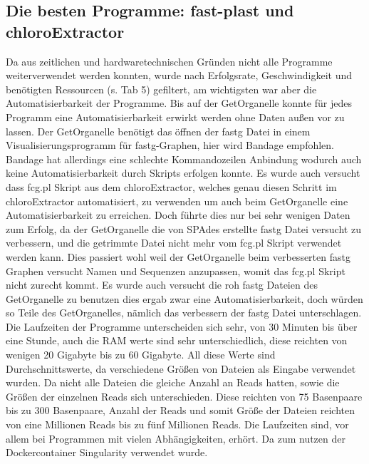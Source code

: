 \documentclass{scrartcl}
\begin{document}
\subsection{Die besten Programme: fast-plast und chloroExtractor}
\label{sec-4-5}
Da aus zeitlichen und hardwaretechnischen Gründen nicht alle Programme weiterverwendet werden konnten, wurde nach Erfolgsrate, Geschwindigkeit und benötigten Ressourcen (s. Tab 5)
gefiltert, am wichtigsten war aber die Automatisierbarkeit der Programme. Bis auf der GetOrganelle konnte für jedes Programm eine Automatisierbarkeit
erwirkt werden ohne Daten außen vor zu lassen. Der GetOrganelle benötigt das öffnen der fastg Datei in einem Visualisierungsprogramm für fastg-Graphen, hier wird Bandage empfohlen.
Bandage hat allerdings eine schlechte Kommandozeilen Anbindung wodurch auch keine Automatisierbarkeit durch Skripts erfolgen konnte.
Es wurde auch versucht dass fcg.pl Skript aus dem chloroExtractor, welches genau diesen Schritt im chloroExtractor automatisiert, zu verwenden um auch beim
GetOrganelle eine Automatisierbarkeit zu erreichen. Doch führte dies nur bei sehr wenigen Daten zum Erfolg, da der GetOrganelle die von SPAdes erstellte 
fastg Datei versucht zu verbessern, und die getrimmte Datei nicht mehr vom fcg.pl Skript verwendet werden kann. Dies passiert wohl weil der GetOrganelle beim verbesserten
fastg Graphen versucht Namen und Sequenzen anzupassen, womit das fcg.pl Skript nicht zurecht kommt. Es wurde auch versucht die roh fastg Dateien des GetOrganelle zu benutzen
dies ergab zwar eine Automatisierbarkeit, doch würden so Teile des GetOrganelles, nämlich das verbessern der fastg Datei unterschlagen.
Die Laufzeiten der Programme unterscheiden sich sehr, von 30 Minuten bis über eine Stunde, auch die RAM werte sind sehr unterschiedlich, diese
reichten von wenigen 20 Gigabyte bis zu 60 Gigabyte. All diese Werte sind Durchschnittswerte, da verschiedene Größen von Dateien als Eingabe verwendet wurden. Da nicht alle
Dateien die gleiche Anzahl an Reads hatten, sowie die Größen der einzelnen Reads sich unterschieden. Diese reichten von 75 Basenpaare bis zu 300 Basenpaare, Anzahl der Reads
und somit Größe der Dateien reichten von eine Millionen Reads bis zu fünf Millionen Reads. Die Laufzeiten sind, vor allem bei Programmen mit vielen Abhängigkeiten, erhört. Da zum nutzen
der Dockercontainer Singularity \footnotemark[56]{} verwendet wurde.    
\end{document}
